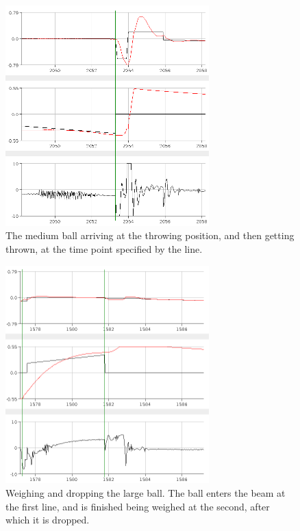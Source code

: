 \begin{figure}[h]
\centering
\includegraphics[width=0.7\textwidth]{figures/throwmediumball-crop.png}
\caption{The medium ball arriving at the throwing position, and then getting thrown, at the time point specified by the line.}
\label{fig:throwmediumball}
\end{figure}

\begin{figure}[h]
\centering
\includegraphics[width=0.7\textwidth]{figures/weighanddroplargeball-crop.png}
\caption{Weighing and dropping the large ball. The ball enters the beam at the first line, and is finished being weighed at the second, after which it is dropped.}
\label{fig:weighbandthrowlargeball}
\end{figure}



